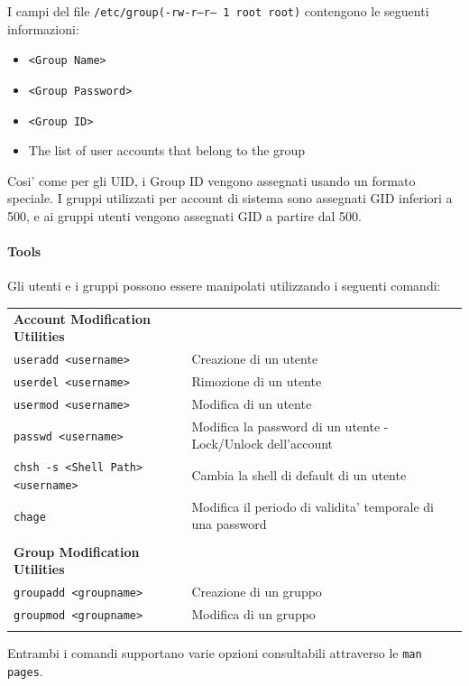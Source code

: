 I campi del file \texttt{/etc/group}\texttt{(-rw-r--r-- 1 root root)} contengono le seguenti informazioni:
\begin{itemize}
	\item \texttt{<Group Name>}
	\item \texttt{<Group Password>}
	\item \texttt{<Group ID>}
	\item The list of user accounts that belong to the group
\end{itemize}
Cosi' come per gli UID, i Group ID vengono assegnati usando un formato speciale. I gruppi utilizzati per account di sistema sono assegnati GID inferiori a 500, e ai gruppi utenti vengono assegnati GID a partire dal 500.

\paragraph{Tools}
Gli utenti e i gruppi possono essere manipolati utilizzando i seguenti comandi: 

\begin{center}
\begin{tabular}{ll}
	\textbf{Account Modification Utilities} & \\
	\texttt{useradd <username>} & Creazione di un utente\\ 
	\texttt{userdel <username>} & Rimozione di un utente\\ 
	\texttt{usermod <username>} & Modifica di un utente\\ 
	\texttt{passwd <username>} & Modifica la password di un utente - Lock/Unlock dell'account\\ 
	\texttt{chsh -s <Shell Path> <username>} & Cambia la shell di default di un utente\\ 
	\texttt{chage}  & Modifica il periodo di validita' temporale di una password \\ 
	\\
	\textbf{Group Modification Utilities} & \\
	\texttt{groupadd <groupname>} & Creazione di un gruppo \\
	\texttt{groupmod <groupname>} & Modifica di un gruppo \\ 
	\\
\end{tabular}
\end{center}

Entrambi i comandi supportano varie opzioni consultabili attraverso le \texttt{man pages}.

